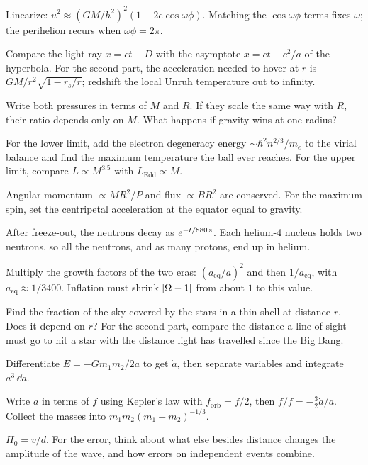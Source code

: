 
 Linearize: $u^2\approx(GM/h^2)^2(1+2e\cos\omega\phi)$. Matching the $\cos\omega\phi$ terms fixes $\omega$; the perihelion recurs when $\omega\phi = 2\pi$.

 Compare the light ray $x = ct - D$ with the asymptote $x = ct - c^2/a$ of the hyperbola. For the second part, the acceleration needed to hover at $r$ is $GM/r^2\sqrt{1-r_s/r}$; redshift the local Unruh temperature out to infinity.


 Write both pressures in terms of $M$ and $R$. If they scale the same way with $R$, their ratio depends only on $M$. What happens if gravity wins at one radius?

 For the lower limit, add the electron degeneracy energy $\sim\hbar^2n^{2/3}/m_e$ to the virial balance and find the maximum temperature the ball ever reaches. For the upper limit, compare $L\propto M^{3.5}$ with $L_{\text{Edd}}\propto M$.

 Angular momentum $\propto MR^2/P$ and flux $\propto BR^2$ are conserved. For the maximum spin, set the centripetal acceleration at the equator equal to gravity.


 After freeze-out, the neutrons decay as $e^{-t/880\,\mathrm{s}}$. Each helium-4 nucleus holds two neutrons, so all the neutrons, and as many protons, end up in helium.

 Multiply the growth factors of the two eras: $(a_{\text{eq}}/a)^2$ and then $1/a_{\text{eq}}$, with $a_{\text{eq}}\approx1/3400$. Inflation must shrink $\left\lvert \Omega - 1\right\rvert$ from about $1$ to this value.

 Find the fraction of the sky covered by the stars in a thin shell at distance $r$. Does it depend on $r$? For the second part, compare the distance a line of sight must go to hit a star with the distance light has travelled since the Big Bang.


 Differentiate $E = -Gm_1m_2/2a$ to get $\dot a$, then separate variables and integrate $a^3\,\dd a$.

 Write $a$ in terms of $f$ using Kepler's law with $f_{\text{orb}} = f/2$, then $\dot f/f = -\tfrac32\dot a/a$. Collect the masses into $m_1m_2(m_1+m_2)^{-1/3}$.

 $H_0 = v/d$. For the error, think about what else besides distance changes the amplitude of the wave, and how errors on independent events combine.

